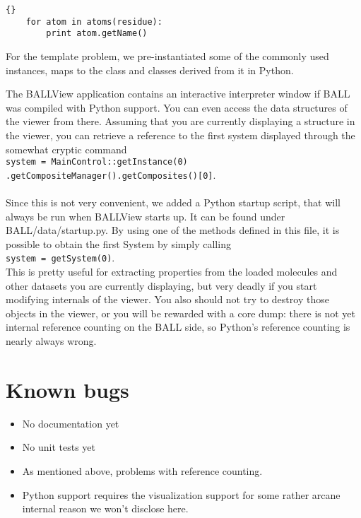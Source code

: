 \begin{lstlisting}{}
	for atom in atoms(residue):
		print atom.getName()
\end{lstlisting}

\noindent For the template problem, we pre-instantiated some of the 
commonly used instances, \eg {} maps to the 
 class and classes derived from it in Python.

The BALLView application contains an interactive interpreter window
if BALL was compiled with Python support. You can even access the
data structures of the viewer from there. Assuming that you are
currently displaying a structure in the viewer, you can retrieve a
reference to the first system displayed through the somewhat cryptic
command 
\\
{\tt system = MainControl::getInstance(0)\\
.getCompositeManager().getComposites()[0]}.
\\ \\
Since this is not very convenient, we added a Python startup script,
that will always be run when BALLView starts up. It can be found
under BALL/data/startup.py. By using one of the methods defined in this file,
it is possible to obtain the first System by simply calling \\
{\tt system = getSystem(0)}.
\\
This is pretty useful for extracting properties from the loaded molecules
and other datasets you are
currently displaying, but very deadly if you start modifying internals
of the viewer. You also should not try to destroy those objects in the
viewer, or you will be rewarded with a core dump: there is not yet
internal reference counting on the BALL side, so Python's reference
counting is nearly always wrong.
		

\section{Known bugs}
\begin{itemize}
	\item No documentation yet
	\item No unit tests yet
	\item As mentioned above, problems with reference counting.
	\item Python support requires the visualization support for some rather
				arcane internal reason we won't disclose here.
\end{itemize}

